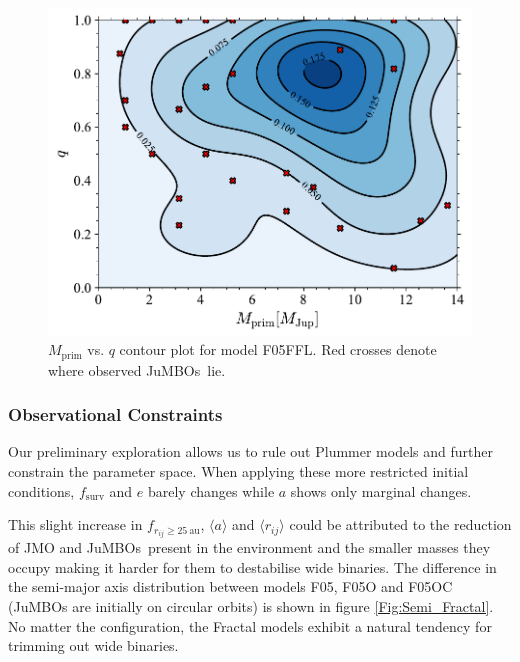 \documentclass[aa]{lib/aa}
\newcommand{\jumbos}{\mbox{JuMBOs}}
\begin{document}
   \begin{figure}
    \centering
        \includegraphics[width=\columnwidth]{figures/Fractal_rvir0.5_FF_10Myr_mass_distr.pdf}
        \caption{$M_{\mathrm{prim}}$ vs. $q$ contour plot for model F05FFL. Red crosses denote where observed \jumbos\, lie.}
         \label{Fig:SimTime_MPrimQ}
   \end{figure}
   
    \subsubsection{Observational Constraints}
    Our preliminary exploration allows us to rule out Plummer models and further constrain the parameter space. When applying these more restricted initial conditions, $f_{\mathrm{surv}}$ and $e$ barely changes while $a$ shows only marginal changes.

    This slight increase in $f_{r_{ij}\geq25\ \mathrm{au}}$, $\langle a\rangle$ and $\langle r_{ij}\rangle$ could be attributed to the reduction of JMO and \jumbos\, present in the environment and the smaller masses they occupy making it harder for them to destabilise wide binaries. The difference in the semi-major axis distribution between models F05, F05O and F05OC (JuMBOs are initially on circular orbits) is shown in figure \ref{Fig:Semi_Fractal}. No matter the configuration, the Fractal models exhibit a natural tendency for trimming out wide binaries.
    
\end{document}
